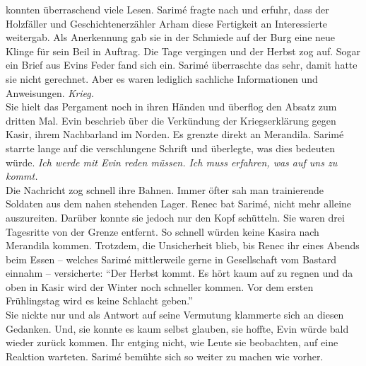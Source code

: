 konnten überraschend viele Lesen. Sarimé fragte nach und erfuhr, dass der Holzfäller und 
Geschichtenerzähler Arham diese Fertigkeit an Interessierte weitergab. Als Anerkennung gab sie in 
der Schmiede auf der Burg eine neue Klinge für sein Beil in Auftrag. Die Tage vergingen und der 
Herbst zog auf. Sogar ein Brief aus Evins Feder fand sich ein. Sarimé überraschte das sehr, damit 
hatte sie nicht gerechnet. Aber es waren lediglich sachliche Informationen und Anweisungen. 
\textit{Krieg.}\\
Sie hielt das Pergament noch in ihren Händen und überflog den Absatz zum dritten Mal. Evin beschrieb 
über die Verkündung der Kriegserklärung gegen Kasir, ihrem Nachbarland im Norden. Es grenzte direkt 
an Merandila. Sarimé starrte lange auf die verschlungene Schrift und überlegte, was dies bedeuten 
würde. \textit{Ich werde mit Evin reden müssen. Ich muss erfahren, was auf uns zu kommt.}\\
Die Nachricht zog schnell ihre Bahnen. Immer öfter sah man trainierende Soldaten aus dem nahen 
stehenden Lager. Renec bat Sarimé, nicht mehr alleine auszureiten. Darüber konnte sie jedoch nur den 
Kopf schütteln. Sie waren drei Tagesritte von der Grenze entfernt. So schnell würden keine Kasira 
nach Merandila kommen. Trotzdem, die Unsicherheit blieb, bis Renec ihr eines Abends beim Essen – 
welches Sarimé mittlerweile gerne in Gesellschaft vom Bastard einnahm – versicherte: ``Der Herbst 
kommt. Es hört kaum auf zu regnen und da oben in Kasir wird der Winter noch schneller kommen. Vor 
dem ersten Frühlingstag wird es keine Schlacht geben.''\\
Sie nickte nur und als Antwort auf seine Vermutung klammerte sich an diesen Gedanken. Und, sie 
konnte es kaum selbst glauben, sie hoffte, Evin würde bald wieder zurück kommen. Ihr entging nicht, 
wie Leute sie beobachten, auf eine Reaktion warteten. Sarimé bemühte sich so weiter zu machen wie 
vorher. \\

